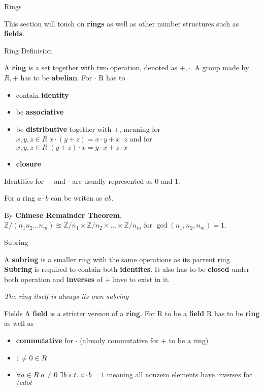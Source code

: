 \documentclass[12pt, letterpaper]{article}
\begin{document}
\begin{section}{Rings}

  This section will touch on \textbf{rings} as well as other number structures
  such as \textbf{fields}.

  \begin{subsection}{Ring Definision}

    A \textbf{ring} is a set together with two operation, denoted as \(+, \cdot\).
    A group made by \(R, +\) has to be \textbf{abelian}. For \(\cdot\) R has to
    \begin{itemize}
      \item contain \textbf{identity}
      \item be \textbf{associative}
      \item be \textbf{distributive} together with \(+\), meaning
            for \(x, y, z \in R \; x \cdot (y + z) = x \cdot y + x \cdot z\) and
            for \(x, y, z \in R \; (y + z) \cdot x = y \cdot x + z \cdot x\)
      \item \textbf{closure}
    \end{itemize}

    Identities for \(+\) and \(\cdot\) are usually represented as 0 and 1.

    For a ring \(a \cdot b\) can be writen as \(ab\).

    By \textbf{Chinese Remainder Theorem},
    \(\mathbb{Z}/(n_{1}n_{2} \dots n_{m}) \approxeq \mathbb{Z}/n_{1} \times
    \mathbb{Z}/n_{2} \times \dots \times \mathbb{Z}/n_{m}\) for
    \(\gcd(n_{1}, n_{2}, n_{m}) = 1\).

  \end{subsection}

  \begin{subsection}{Subring}

    A \textbf{subring} is a smaller ring with the same operations as its
    parrent ring. \textbf{Subring} is required to contain both \textbf{identites}.
    It also has to be \textbf{closed} under both operation and \textbf{inverses}
    of \(+\) have to exist in it.

    \emph{The ring itself is always its own subring}

  \end{subsection}

  \begin{subsection}{Fields}
    A \textbf{field} is a stricter version of a \textbf{ring}. For R to be a
    \textbf{field} R has to be \textbf{ring} as well as
    \begin{itemize}
      \item \textbf{commutative} for \(\cdot\)
            (already commutative for \(+\) to be a ring)
      \item \(1 \neq 0 \in R\)
      \item \(\forall a \in R \; a \neq 0 \; \exists b \; s.t. \; a \cdot b = 1\)
            meaning all nonzero elements have inverses for \(/cdot\)
    \end{itemize}


\end{subsection}
\end{section}
\end{document}
